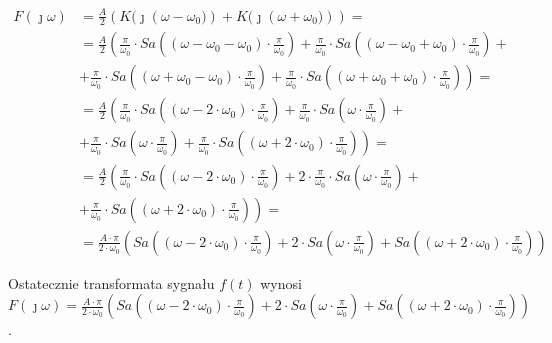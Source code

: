 \begin{task}
\begin{align*}
F(\jmath \omega)&=\frac{A}{2} \left( K(\jmath \left(\omega -\omega_0)\right) + K(\jmath \left(\omega + \omega_0)\right) \right) = \\
&=\frac{A}{2} \left( \frac{\pi}{\omega_0} \cdot Sa\left(\left(\omega -\omega_0 - \omega_0 \right)\cdot \frac{\pi}{\omega_0}\right) +\frac{\pi}{\omega_0} \cdot Sa\left(\left(\omega-\omega_0+\omega_0\right) \cdot \frac{\pi}{\omega_0}\right)\right. + \\
&+ \left.\frac{\pi}{\omega_0} \cdot Sa\left(\left(\omega+\omega_0 - \omega_0 \right)\cdot \frac{\pi}{\omega_0}\right) +\frac{\pi}{\omega_0} \cdot Sa\left(\left(\omega+\omega_0+\omega_0\right) \cdot \frac{\pi}{\omega_0}\right) \right) = \\
&=\frac{A}{2} \left( \frac{\pi}{\omega_0} \cdot Sa\left(\left(\omega -2 \cdot\omega_0 \right)\cdot \frac{\pi}{\omega_0}\right) +\frac{\pi}{\omega_0} \cdot Sa\left(\omega \cdot \frac{\pi}{\omega_0}\right)\right. + \\
&+ \left.\frac{\pi}{\omega_0} \cdot Sa\left(\omega \cdot \frac{\pi}{\omega_0}\right) +\frac{\pi}{\omega_0} \cdot Sa\left(\left(\omega+2\cdot\omega_0\right) \cdot \frac{\pi}{\omega_0}\right) \right) = \\
&=\frac{A}{2} \left( \frac{\pi}{\omega_0} \cdot Sa\left(\left(\omega -2 \cdot\omega_0 \right)\cdot \frac{\pi}{\omega_0}\right) +2 \cdot \frac{\pi}{\omega_0} \cdot Sa\left(\omega \cdot \frac{\pi}{\omega_0}\right)\right. + \\
&+ \left. \frac{\pi}{\omega_0} \cdot Sa\left(\left(\omega+2\cdot\omega_0\right) \cdot \frac{\pi}{\omega_0}\right) \right) = \\
&=\frac{A \cdot \pi}{2 \cdot \omega_0} \left( Sa\left(\left(\omega -2 \cdot\omega_0 \right)\cdot \frac{\pi}{\omega_0}\right) +2 \cdot Sa\left(\omega \cdot \frac{\pi}{\omega_0}\right) + Sa\left(\left(\omega+2\cdot\omega_0\right) \cdot \frac{\pi}{\omega_0}\right) \right)
\end{align*}

Ostatecznie transformata sygnału $f(t)$ wynosi $F(\jmath \omega)=\frac{A \cdot \pi}{2 \cdot \omega_0} \left( Sa\left(\left(\omega -2 \cdot\omega_0 \right)\cdot \frac{\pi}{\omega_0}\right) +2 \cdot Sa\left(\omega \cdot \frac{\pi}{\omega_0}\right) + Sa\left(\left(\omega+2\cdot\omega_0\right) \cdot \frac{\pi}{\omega_0}\right) \right)$.

\end{task}

